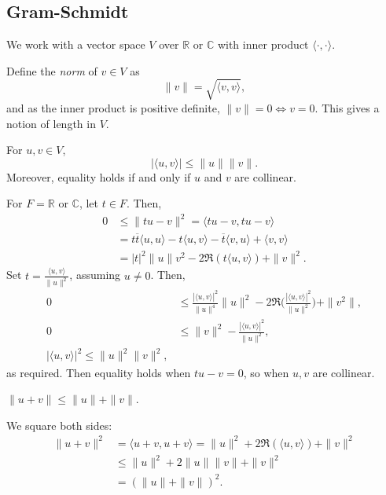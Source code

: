 \documentclass[12pt]{article}
\begin{document}
\subsection{Gram-Schmidt}
\label{sub:gram_schmidt}

We work with a vector space $V$ over $\mathbb{R}$ or $\mathbb{C}$ with inner product $\langle \cdot, \cdot \rangle$.

Define the \textit{norm} of $v \in V$ as
\[
	\|v\| = \sqrt{\langle v, v \rangle}
,\]
and as the inner product is positive definite, $\|v\| = 0 \iff v = 0$. This gives a notion of length in $V$.

\begin{lemma}
	For $u, v \in V$,
	\[|\langle u, v \rangle| \leq \|u\|\|v\|.\]
	Moreover, equality holds if and only if $u$ and $v$ are collinear.
\end{lemma}

\begin{proofbox}
	For $F = \mathbb{R}$ or $\mathbb{C}$, let $t \in F$. Then,
	\begin{align*}
		0 &\leq \|tu-v\|^2 = \langle tu-v, tu-v\rangle \\
		  &= t \overline{t}\langle u, u \rangle - t \langle u, v \rangle - \overline{t} \langle v, u \rangle + \langle v, v\rangle \\
		  &= |t|^2\|u\|v^2 - 2 \Re (t \langle u, v \rangle) + \|v\|^2.
	\end{align*}
	Set $t = \frac{\langle u, v \rangle}{\|u\|^2}$, assuming $u \neq 0$. Then,
	\begin{align*}
		0 &\leq \frac{|\langle u, v \rangle|^2}{\|u\|^{4}}\|u\|^2 - 2 \Re \biggl( \frac{|\langle u, v \rangle|^2}{\|u\|^2} \biggr) + \|v^2\|, \\
		0 &\leq \|v\|^2 - \frac{|\langle u, v \rangle|^2}{\|u\|^2}, \\
		|\langle u, v \rangle|^2 \leq \|u\|^2\|v\|^2,
	\end{align*}
	as required. Then equality holds when $tu-v = 0$, so when $u, v$ are collinear.
\end{proofbox}

\begin{corollary}
	$\|u + v\| \leq \|u\| + \|v\|$.
\end{corollary}

\begin{proofbox}
	We square both sides:
	\begin{align*}
		\|u+v\|^2 &= \langle u + v, u + v \rangle = \|u\|^2 + 2 \Re (\langle u, v \rangle) + \|v\|^2 \\
			  &\leq \|u\|^2 + 2 \|u\|\|v\| + \|v\|^2 \\
			  &= (\|u\| + \|v\|)^2.
	\end{align*}
\end{proofbox}
\end{document}
